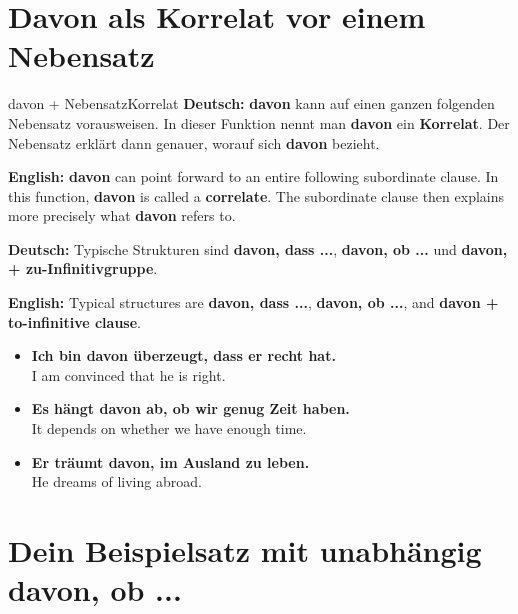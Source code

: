 \documentclass[a4paper,11pt]{article}
\newcommand{\GermanText}[1]{\textbf{Deutsch: }#1\par}
\newcommand{\EnglishText}[1]{{\small\color{SoftGray}\textbf{English: }#1\par}}
\newcommand{\ExampleItem}[2]{\item \textbf{#1}\\{\small\color{SoftGray}#2}}
\begin{document}
    \section{Davon als Korrelat vor einem Nebensatz}

        \begin{grammarentry}{davon + Nebensatz}{Korrelat}
            \GermanText{\textbf{davon} kann auf einen ganzen folgenden Nebensatz vorausweisen. In dieser Funktion nennt man \textbf{davon} ein \textbf{Korrelat}. Der Nebensatz erklärt dann genauer, worauf sich \textbf{davon} bezieht.}
            \EnglishText{\textbf{davon} can point forward to an entire following subordinate clause. In this function, \textbf{davon} is called a \textbf{correlate}. The subordinate clause then explains more precisely what \textbf{davon} refers to.}

            \GermanText{Typische Strukturen sind \textbf{davon, dass ...}, \textbf{davon, ob ...} und \textbf{davon, + zu-Infinitivgruppe}.}
            \EnglishText{Typical structures are \textbf{davon, dass ...}, \textbf{davon, ob ...}, and \textbf{davon + to-infinitive clause}.}
        \end{grammarentry}

        \begin{exbox}
            \begin{itemize}
                \ExampleItem{Ich bin davon überzeugt, dass er recht hat.}{I am convinced that he is right.}
                \ExampleItem{Es hängt davon ab, ob wir genug Zeit haben.}{It depends on whether we have enough time.}
                \ExampleItem{Er träumt davon, im Ausland zu leben.}{He dreams of living abroad.}
            \end{itemize}
        \end{exbox}

    \section{Dein Beispielsatz mit \glqq unabhängig davon, ob ...\grqq}
\end{document}
